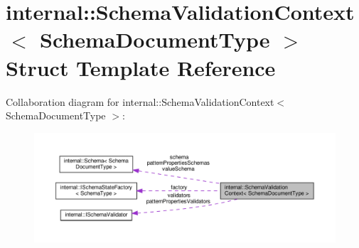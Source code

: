 \hypertarget{structinternal_1_1SchemaValidationContext}{}\section{internal\+:\+:Schema\+Validation\+Context$<$ Schema\+Document\+Type $>$ Struct Template Reference}
\label{structinternal_1_1SchemaValidationContext}


Collaboration diagram for internal\+:\+:Schema\+Validation\+Context$<$ Schema\+Document\+Type $>$\+:
\nopagebreak
\begin{figure}[H]
\begin{center}
\leavevmode
\includegraphics[width=350pt]{structinternal_1_1SchemaValidationContext__coll__graph}
\end{center}
\end{figure}
